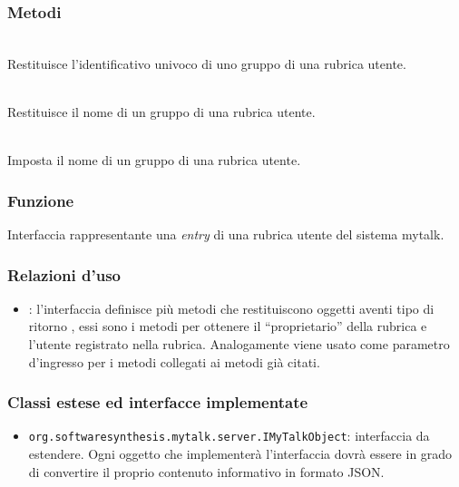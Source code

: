 \subsubsection*{Metodi}
\begin{description}
	\item{}\\
	Restituisce l'identificativo univoco di uno gruppo di una rubrica utente.
	\item{}\\
	Restituisce il nome di un gruppo di una rubrica utente.
	\item{}\\
	Imposta il nome di un gruppo di una rubrica utente.
\end{description}


\subsubsection*{Funzione}
Interfaccia rappresentante una \textit{entry} di una rubrica utente del sistema mytalk.

\subsubsection*{Relazioni d'uso}
\begin{itemize}
	\item {}: l'interfaccia  definisce più metodi che restituiscono oggetti aventi tipo di ritorno , essi sono i metodi  per ottenere il ``proprietario'' della rubrica e l'utente registrato nella rubrica. Analogamente  viene usato come parametro d'ingresso per i metodi  collegati ai metodi già citati.
\end{itemize}

\subsubsection*{Classi estese ed interfacce implementate}
\begin{itemize}
		\item \texttt{org.softwaresynthesis.mytalk.server.IMyTalkObject}: interfaccia da estendere. Ogni oggetto che implementerà l'interfaccia  dovrà essere in grado di convertire il proprio contenuto informativo in formato JSON.
\end{itemize}

